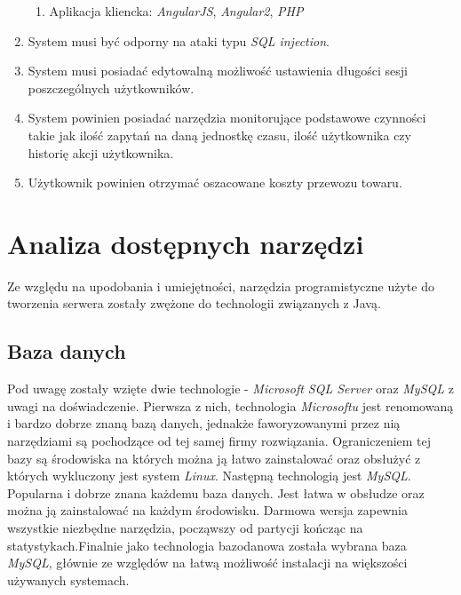 \documentclass[10pt,titlepage]{article} %
\begin{document}
\begin{enumerate}[1.]
\begin{enumerate}
\item Aplikacja kliencka: \textit{AngularJS}, \textit{Angular2}, \textit{PHP}
\end{enumerate} 
\item System musi być odporny na ataki typu \textit{SQL injection}.
\item System musi posiadać edytowalną możliwość ustawienia długości sesji poszczególnych użytkowników.
\item System powinien posiadać narzędzia monitorujące podstawowe czynności takie jak ilość zapytań na daną jednostkę czasu, ilość użytkownika czy historię akcji użytkownika.
\item Użytkownik powinien otrzymać oszacowane koszty przewozu towaru.
\end{enumerate}

\newpage
\section{Analiza dostępnych narzędzi}
Ze względu na upodobania i umiejętności, narzędzia programistyczne użyte do tworzenia serwera zostały zwężone do technologii związanych z Javą.
\subsection{Baza danych}

Pod uwagę zostały wzięte dwie technologie - \textit{Microsoft SQL Server} oraz \textit{MySQL} z uwagi na doświadczenie. \mbox\\
Pierwsza z nich, technologia \textit{Microsoftu} jest renomowaną i bardzo dobrze znaną bazą danych, jednakże faworyzowanymi przez nią narzędziami są pochodzące od tej samej firmy rozwiązania. Ograniczeniem tej bazy są środowiska na których można ją łatwo zainstalować oraz obsłużyć z których wykluczony jest system \textit{Linux}. \mbox\\

Następną technologią jest \textit{MySQL}. Popularna i dobrze znana każdemu baza danych. Jest łatwa w obsłudze oraz można ją zainstalować na każdym środowisku. Darmowa wersja zapewnia wszystkie niezbędne narzędzia, począwszy od partycji kończąc na statystykach.\mbox\\
Finalnie jako technologia bazodanowa została wybrana baza \textit{MySQL}, głównie ze względów na łatwą możliwość instalacji na większości używanych systemach.
\end{document}
